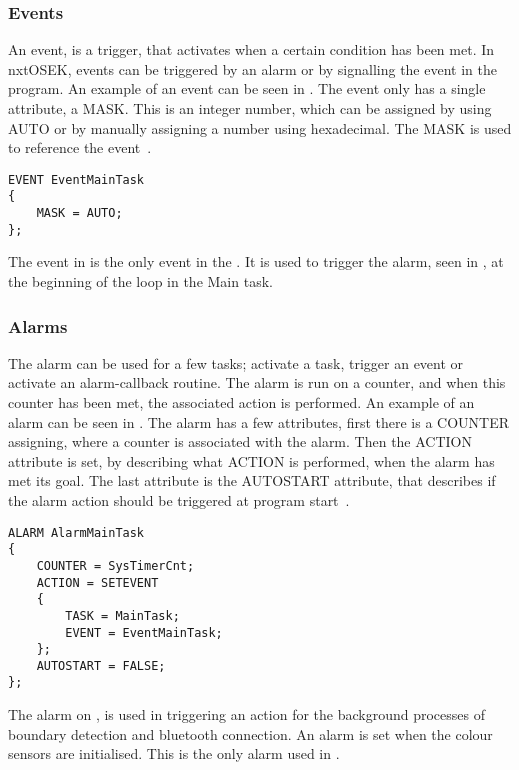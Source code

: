\subsubsection{Events} \label{sec:events}
An event, is a trigger, that activates when a certain condition has been met. In nxtOSEK, events can be triggered by an alarm or by signalling the event in the program. An example of an event can be seen in . The event only has a single attribute, a MASK. This is an integer number, which can be assigned by using AUTO or by manually assigning a number using hexadecimal. The MASK is used to reference the event~\citep{osekoil}. 

\begin{lstlisting}[caption= An example of an event used in the \projname{}, label=lst:eventexample]
EVENT EventMainTask
{
    MASK = AUTO;
};
\end{lstlisting}

The event in  is the only event in the \projname{}. It is used to trigger the alarm, seen in , at the beginning of the loop in the Main task. 


\subsubsection{Alarms} \label{sec:alarms}
The alarm can be used for a few tasks; activate a task, trigger an event or activate an alarm-callback routine. The alarm is run on a counter, and when this counter has been met, the associated action is performed. An example of an alarm can be seen in . The alarm has a few attributes, first there is a COUNTER assigning, where a counter is associated with the alarm. Then the ACTION attribute is set, by describing what ACTION is performed, when the alarm has met its goal. The last attribute is the AUTOSTART attribute, that describes if the alarm action should be triggered at program start~\citep{osekoil}.

\begin{lstlisting}[caption= An example of an alarm used in the \projname{}, label=lst:alarmexample]
ALARM AlarmMainTask
{
    COUNTER = SysTimerCnt;
    ACTION = SETEVENT
    {
        TASK = MainTask;
        EVENT = EventMainTask;
    };
    AUTOSTART = FALSE;
};
\end{lstlisting}

The alarm on , is used in triggering an action for the background processes of boundary detection and bluetooth connection. An alarm is set when the colour sensors are initialised. This is the only alarm used in \projname{}.

